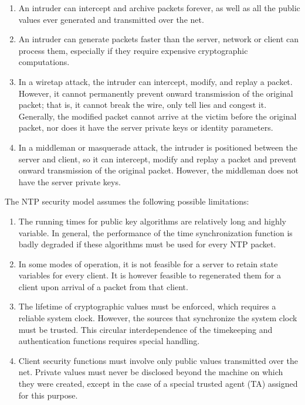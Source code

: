 \begin{enumerate}

  \item An intruder can intercept and archive packets forever, as well as
    all the public values ever generated and transmitted over the
    net.

  \item An intruder can generate packets faster than the server, network
    or client can process them, especially if they require expensive
    cryptographic computations.

  \item In a wiretap attack, the intruder can intercept, modify, and
    replay a packet. However, it cannot permanently prevent onward
    transmission of the original packet; that is, it cannot break the
    wire, only tell lies and congest it. Generally, the modified
    packet cannot arrive at the victim before the original packet,
    nor does it have the server private keys or identity parameters.

  \item In a middleman or masquerade attack, the intruder is positioned
    between the server and client, so it can intercept, modify and
    replay a packet and prevent onward transmission of the original
    packet. However, the middleman does not have the server private
    keys.

\end{enumerate}

The NTP security model assumes the following possible limitations:

\begin{enumerate}

  \item The running times for public key algorithms are relatively long
    and highly variable. In general, the performance of the time
    synchronization function is badly degraded if these algorithms
    must be used for every NTP packet.

  \item In some modes of operation, it is not feasible for a server to
    retain state variables for every client. It is however feasible
    to regenerated them for a client upon arrival of a packet from
    that client.

  \item The lifetime of cryptographic values must be enforced, which
    requires a reliable system clock. However, the sources that
    synchronize the system clock must be trusted. This circular
    interdependence of the timekeeping and authentication functions
    requires special handling.

  \item Client security functions must involve only public values
    transmitted over the net. Private values must never be disclosed
    beyond the machine on which they were created, except in the case
    of a special trusted agent (TA) assigned for this purpose.

\end{enumerate}

